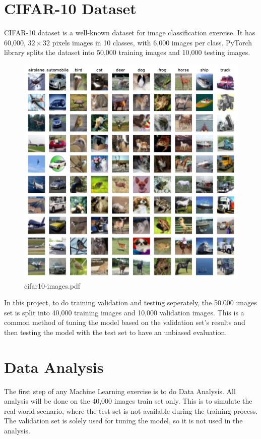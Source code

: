 \documentclass{report}
\begin{document}
\section{CIFAR-10 Dataset}
CIFAR-10 dataset is a well-known dataset for image classification exercise. It has 60,000, $32\times32$ pixels images 
in 10 classes, with 6,000 images per class. PyTorch library splits the dataset into 50,000 training images and 
10,000 testing images. 

\begin{figure}[ht]
    \center
    \includegraphics[scale=0.7]{../output/cifar10-images.pdf}
    \caption{cifar10-images.pdf}
\end{figure}

In this project, to do training validation and testing seperately, the 50.000 images set is split into 40,000 
training images and 10,000 validation images. This is a common method of tuning the model based on the validation 
set's results and then testing the model with the test set to have an unbiased evaluation.

\section{Data Analysis}
The first step of any Machine Learning exercise is to do Data Analysis. All analysis will be done on the 40,000 
images train set only. This is to simulate the real world scenario, where the test set is not available during the 
training process. The validation set is solely used for tuning the model, so it is not used in the analysis.
\end{document}
